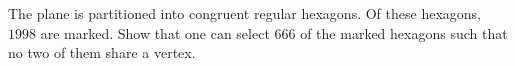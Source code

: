 The plane is partitioned into congruent regular hexagons. Of these hexagons, $1998$ are marked. Show that one can select $666$ of the marked hexagons such that no two of them share a vertex.
